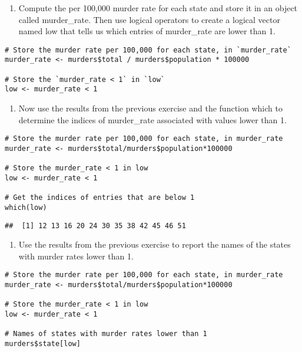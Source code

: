 \documentclass[
]{article}
\providecommand{\tightlist}{%
  \setlength{\itemsep}{0pt}\setlength{\parskip}{0pt}}
\begin{document}
\begin{enumerate}
\def\labelenumi{\arabic{enumi}.}
\tightlist
\item
  Compute the per 100,000 murder rate for each state and store it in an
  object called murder\_rate. Then use logical operators to create a
  logical vector named low that tells us which entries of murder\_rate
  are lower than 1.
\end{enumerate}

\begin{verbatim}
# Store the murder rate per 100,000 for each state, in `murder_rate`
murder_rate <- murders$total / murders$population * 100000

# Store the `murder_rate < 1` in `low` 
low <- murder_rate < 1
\end{verbatim}

\begin{enumerate}
\def\labelenumi{\arabic{enumi}.}
\setcounter{enumi}{1}
\tightlist
\item
  Now use the results from the previous exercise and the function which
  to determine the indices of murder\_rate associated with values lower
  than 1.
\end{enumerate}

\begin{verbatim}
# Store the murder rate per 100,000 for each state, in murder_rate
murder_rate <- murders$total/murders$population*100000

# Store the murder_rate < 1 in low 
low <- murder_rate < 1

# Get the indices of entries that are below 1
which(low)
\end{verbatim}

\begin{verbatim}
##  [1] 12 13 16 20 24 30 35 38 42 45 46 51
\end{verbatim}

\begin{enumerate}
\def\labelenumi{\arabic{enumi}.}
\setcounter{enumi}{2}
\tightlist
\item
  Use the results from the previous exercise to report the names of the
  states with murder rates lower than 1.
\end{enumerate}

\begin{verbatim}
# Store the murder rate per 100,000 for each state, in murder_rate
murder_rate <- murders$total/murders$population*100000

# Store the murder_rate < 1 in low 
low <- murder_rate < 1

# Names of states with murder rates lower than 1
murders$state[low]
\end{verbatim}
\end{document}
